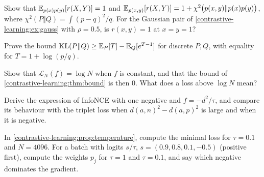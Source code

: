 \begin{notechapter}
\begin{exercise}\label{contrastive-learning:exr:1}
Show that $\mathbb{E}_{p(x)p(y)}[r(X, Y)] = 1$ and $\mathbb{E}_{p(x,y)}[r(X, Y)] = 1 + \chi^2\bigl(p(x, y)\Vert p(x)p(y)\bigr)$, where $\chi^2(P\Vert Q) = \int(p - q)^2/q$. For the
Gaussian pair of \cref{contrastive-learning:ex:gauss} with $\rho = 0.5$, is $r(x, y) = 1$ at $x = y = 1$?
\end{exercise}

\begin{exercise}\label{contrastive-learning:exr:2}
Prove the bound $\mathrm{KL}(P\Vert Q)\geq\mathbb{E}_P[T] - \mathbb{E}_Q[e^{T-1}]$ for discrete $P, Q$, with equality for $T = 1 + \log(p/q)$.
\end{exercise}

\begin{exercise}\label{contrastive-learning:exr:3}
Show that $\mathcal L_N(f) = \log N$ when $f$ is constant, and that the bound of \cref{contrastive-learning:thm:bound} is then $0$. What does a
loss above $\log N$ mean?
\end{exercise}

\begin{exercise}\label{contrastive-learning:exr:4}
Derive the expression of InfoNCE with one negative and $f = -d^2/\tau$, and compare its behaviour with the
triplet loss when $d(a, n)^2 - d(a, p)^2$ is large and when it is negative.
\end{exercise}

\begin{exercise}\label{contrastive-learning:exr:5}
In \cref{contrastive-learning:prop:temperature}, compute the minimal loss for $\tau = 0.1$ and $N = 4096$. For a batch with logits
$s/\tau$, $s = (0.9, 0.8, 0.1, -0.5)$ (positive first), compute the weights $p_j$ for $\tau = 1$ and $\tau = 0.1$, and say which negative
dominates the gradient.
\end{exercise}
\end{notechapter}
